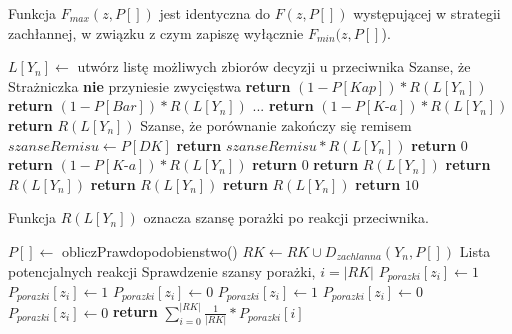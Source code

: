 Funkcja $F_{max}(z, P[])$ jest identyczna do $F(z, P[])$ występującej w strategii zachłannej, w związku z czym zapiszę wyłącznie $F_{min}(z, P[]$).
\begin{algorithmic}[1]
		\State $L[Y_n] \gets$ utwórz listę możliwych zbiorów decyzji u przeciwnika 
			 \Comment Szanse, że Strażniczka \textbf{nie} przyniesie zwycięstwa
				\State \textbf{return} $ (1 - P[Kap]) * R(L[Y_n]) $
			\EndCase
				\State \textbf{return} $ (1 - P[Bar]) * R(L[Y_n]) $
			\EndCase
				\State ...
				\State \textbf{return} $ (1 - P[\textit{K-a}]) * R(L[Y_n]) $
			\EndCase
				\State \textbf{return} $  R(L[Y_n]) $
			\EndCase
				\Comment Szanse, że porównanie zakończy się remisem 
				\State $ szanseRemisu \gets P[DK]$ 
				\State \textbf{return} $ szanseRemisu * R(L[Y_n]) $
			\EndCase
				\State \textbf{return} $ 0 $
			\EndCase
				\State \textbf{return} $ (1 - P[\textit{K-a}]) * R(L[Y_n]) $
			\EndCase
					\State \textbf{return} $ 0 $
				\Else
					\State \textbf{return} $ R(L[Y_n]) $
				\EndIf
			\EndCase
				\State \textbf{return} $ R(L[Y_n]) $
			\EndCase
				\State \textbf{return} $ R(L[Y_n]) $
			\EndCase
				\State \textbf{return} $ R(L[Y_n]) $
			\EndCase
			\State \textbf{return} $ 10 $
			\EndCase
		\EndSwitch
	\EndFunction
\end{algorithmic}

Funkcja $R(L[Y_n])$ oznacza szansę porażki po reakcji przeciwnika.
\begin{algorithmic}[1]
			\State $P[] \gets$ obliczPrawdopodobienstwo()
			\State $RK \gets RK \cup D_{zachlanna}(Y_n, P[]) $	\Comment Lista potencjalnych reakcji
		\EndFor
			\Comment Sprawdzenie szansy porażki, $i=|RK|$
					\State $P_{porazki}[z_i] \gets 1$
				\EndCase
						\State $P_{porazki}[z_i] \gets 1$
					\Else
						\State $P_{porazki}[z_i] \gets 0$
					\EndIf
				\EndCase
						\State $P_{porazki}[z_i] \gets 1$
					\Else
						\State $P_{porazki}[z_i] \gets 0$
					\EndIf
				\EndCase
					$P_{porazki}[z_i] \gets 0$
				\EndCase
			\EndSwitch
		\EndFor
		\State \textbf{return} $ \sum_{i=0}^{|RK|} \frac{1}{|RK|} * P_{porazki}[i] $
	\EndFunction
\end{algorithmic}


